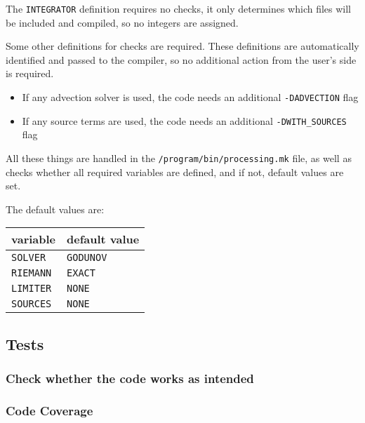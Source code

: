 The \texttt{INTEGRATOR} definition requires no checks, it only determines which files will be included and compiled, so no integers are assigned.



Some other definitions for checks are required.
These definitions are automatically identified and passed to the compiler, so no additional action from the user's side is required.

\begin{itemize}
	\item 	If any advection solver is used, the code needs an additional \texttt{-DADVECTION} flag
	\item 	If any source terms are used, the code needs an additional \texttt{-DWITH_SOURCES} flag
\end{itemize}



All these things are handled in the \texttt{/program/bin/processing.mk} file, as well as checks whether all required variables are defined, and if not, default values are set.

The default values are:

\begin{center}
\begin{tabular}{l l}

\textbf{variable}		&	\textbf{default value}		\\
\hline

\texttt{SOLVER}			&	\texttt{GODUNOV}			\\
\texttt{RIEMANN}		&	\texttt{EXACT}				\\
\texttt{LIMITER}		&	\texttt{NONE}				\\
\texttt{SOURCES}		&	\texttt{NONE}				\\
\end{tabular}
\end{center}










\subsection{Tests}

\subsubsection*{Check whether the code works as intended}


\subsubsection*{Code Coverage}
